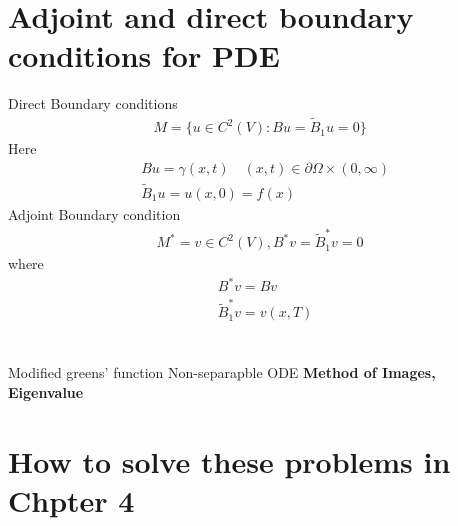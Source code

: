 \documentclass{article}
\numberwithin{equation}{section}
\newcommand{\<}{\langle}
\begin{document}
\section{Adjoint and direct boundary conditions for PDE}
Direct Boundary conditions
\begin{align}
	M = \{u \in C^2 (V): Bu = \tilde{B}_1u=0\}
\end{align}
Here
\begin{align}
	&Bu = \gamma(x,t) \quad (x,t) \in \partial \Omega\times (0,\infty)\\
	&\tilde{B}_1u = u(x,0) = f(x)
\end{align}
Adjoint Boundary condition
\begin{align}
	M^* = {v\in C^2(V),B^*v = \tilde{B}^*_1 v = 0}
\end{align}
where 
\begin{align}
	&B^*v = Bv\\
	&\tilde{B}_1^*v = v(x,T)
\end{align}
\section*{}
Modified greens' function
Non-separapble ODE
\textbf{Method of Images, Eigenvalue}
\section{How to solve these problems in Chpter 4}
\end{document}
